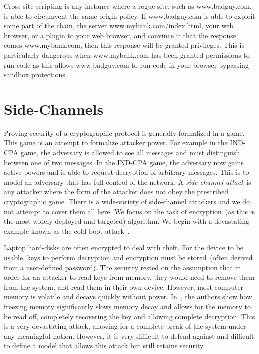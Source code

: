 \documentclass{article}
\begin{document}
Cross site-scripting is any instance where a rogue site, such as www.badguy.com, is able to circumvent the same-origin policy.  If www.badguy.com is able to exploit some part of the chain, the server www.mybank.com/index.html, your web browser, or a plugin to your web browser, and convince it that the response comes www.mybank.com, then this response will be granted privileges.  This is particularly dangerous when www.mybank.com has been granted permissions to run code as this allows www.badguy.com to run code in your browser bypassing sandbox protections.
\section{Side-Channels}\label{sec:side channels}
Proving security of a cryptographic protocol is generally formalized in a game.  This game is an attempt to formalize attacker power.  For example in the IND-CPA game, the adversary is allowed to see all messages and must distinguish between one of two messages.  In the IND-CPA game, the adversary now gains active powers and is able to request decryption of arbitrary messages.  This is to model an adversary that has full control of the network.  A \emph{side-channel attack} is any attacker where the form of the attacker does not obey the prescribed cryptographic game.  There is a wide-variety of side-channel attackers and we do not attempt to cover them all here.  We focus on the task of encryption~(as this is the most widely deployed and targeted) algorithm.  We begin with a devastating example known as the cold-boot attack~\cite{coldboot}.

Laptop hard-disks are often encrypted to deal with theft.  For the device to be usable, keys to perform decryption and encryption must be stored~(often derived from a user-defined password).  The security rested on the assumption that in order for an attacker to read keys from memory, they would need to remove them from the system, and read them in their own device.  However, most computer memory is volatile and decays quickly without power.  In~\cite{coldboot}, the authors show how freezing memory significantly slows memory decay and allows for the memory to be read off, completely recovering the key and allowing complete decryption.  This is a very devastating attack, allowing for a complete break of the system under any meaningful notion.  However, it is very difficult to defend against and difficult to define a model that allows this attack but still retains security.
\end{document}
